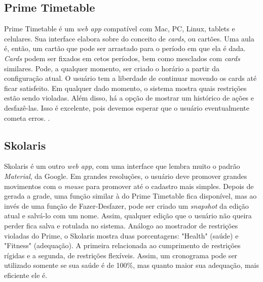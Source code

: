 \documentclass[12pt,a4paper]{article}
\begin{document}
		\subsection{Prime Timetable}

			\par Prime Timetable é um \textit{web app} compatível com Mac, PC, Linux, tablets e celulares. Sua interface elabora sobre do conceito de \textit{cards}, ou cartões. Uma aula é, então, um cartão que pode ser arrastado para o período em que ela é dada.  \textit{Cards} podem ser fixados em cetos períodos, bem como mesclados com \textit{cards} similares. Pode, a qualquer momento, ser criado o horário a partir da configuração atual. O usuário tem a liberdade de continuar movendo os cards até ficar satisfeito. Em qualquer dado momento, o sistema mostra quais restrições estão sendo violadas. Além disso, há a opção de mostrar um histórico de ações e desfazê-las. Isso é excelente, pois devemos esperar que o usuário eventualmente cometa erros. \cite{norman, gnome_hig}.

		\subsection{Skolaris}

			\par Skolaris é um outro \textit{web app}, com uma interface que lembra muito o padrão \textit{Material}, da Google. Em grandes resoluções, o usuário deve promover grandes movimentos com o \textit{mouse} para promover até o cadastro mais simples. Depois de gerada a grade, uma função similar à do Prime Timetable fica disponível, mas ao invés de uma função de Fazer-Desfazer, pode ser criado um \textit{snapshot} da edição atual e salvá-lo com um nome. Assim, qualquer edição que o usuário não queira perder fica salva e rotulada no sistema. Análogo ao mostrador de restrições violadas do Prime, o Skolaris mostra duas porcentagens: "Health" (saúde) e "Fitness" (adequação). A primeira relacionada ao cumprimento de restrições rígidas e a segunda, de restrições flexíveis. Assim, um cronograma pode ser utilizado somente se sua saúde é de 100\%, mas quanto maior sua adequação, mais eficiente ele é.


\end{document}
